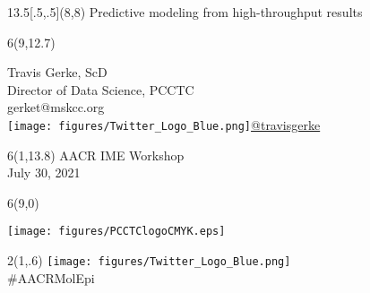 \documentclass{beamer}
\begin{document}
\begin{frame}

\begin{textblock}{13.5}[.5,.5](8,8)
\centering
\normalsize{Predictive modeling from high-throughput results}
\end{textblock}

\begin{textblock}{6}(9,12.7)
\begin{flushright}
\scriptsize{Travis Gerke, ScD}\\
\tiny{Director of Data Science, PCCTC}\\
\tiny{gerket@mskcc.org}\\
\texttt{[image: figures/Twitter\_Logo\_Blue.png]}\tiny{\href{https://twitter.com/travisgerke}{@travisgerke}}\\
\end{flushright}
\end{textblock}

\begin{textblock}{6}(1,13.8)
\tiny{AACR IME Workshop\\July 30, 2021\\}
\end{textblock}

\begin{textblock}{6}(9,0)
\begin{flushright}
\texttt{[image: figures/PCCTClogoCMYK.eps]}
\end{flushright}
\end{textblock}

\begin{textblock}{2}(1,.6)
\centering
\texttt{[image: figures/Twitter\_Logo\_Blue.png]}\\
\scriptsize{\#AACRMolEpi}
\end{textblock}

\end{frame}
\end{document}
